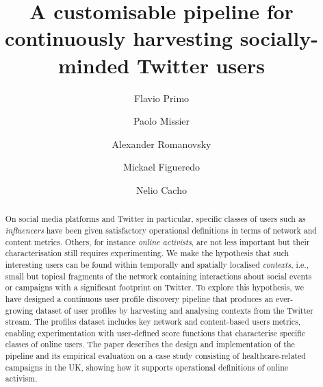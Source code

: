\documentclass[runningheads]{llncs}
\begin{document}
    \title{A customisable pipeline for continuously harvesting socially-minded Twitter users}
    \author{Flavio Primo \and
    Paolo Missier \and
    Alexander Romanovsky \and
    Mickael Figueredo \and
    Nelio Cacho}
    
    \maketitle       %
    
    \begin{abstract}
    	On social media platforms and Twitter in particular, specific classes of users such as \textit{influencers}  have been given satisfactory operational definitions in terms of  network and content metrics.
    	Others, for instance \textit{online activists}, are not less important but their characterisation still requires experimenting.
       We make  the hypothesis that such interesting users can be found within temporally and spatially localised \textit{contexts}, i.e., small but topical fragments of the network containing interactions about social events or campaigns with a significant footprint on Twitter.
    	To explore this hypothesis, we have designed a continuous user profile discovery pipeline that produces an ever-growing dataset of user profiles by harvesting and analysing contexts from the Twitter stream.
    	The profiles dataset includes key network and content-based users metrics, enabling experimentation with user-defined score functions that characterise specific classes of online users.
        The paper describes the design and implementation of  the pipeline and its empirical evaluation on a case study consisting of healthcare-related campaigns in the UK, showing how it supports operational definitions of online activism.
    	
    \end{abstract}
    
\end{document}
